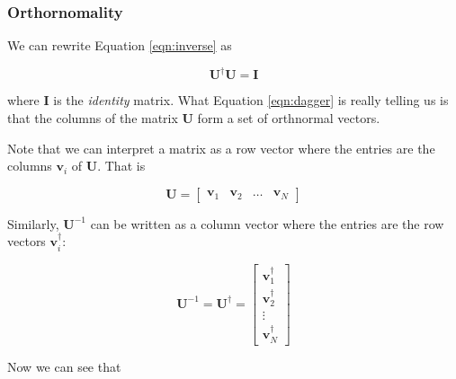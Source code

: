 \documentclass[11pt, oneside]{article}   	%
\begin{document}
\subsubsection{Orthornomality}
We can rewrite Equation \ref{eqn:inverse} as

\begin{equation}
\mathbf{U}^{\dagger} \mathbf{U} = \mathbf{I}
\label{eqn:dagger}
\end{equation}

\bigskip
\noindent
where \textbf{I} is the \emph{identity} matrix. What Equation \ref{eqn:dagger} is really telling us is that the columns of the matrix \textbf{U} form a set of orthnormal vectors.

\bigskip
\noindent
Note that we can interpret a matrix as a row vector where the entries are the columns  $\mathbf{v}_i$ of \textbf{U}. That is

\begin{equation*}
\mathbf{U} = \begin{bmatrix} \mathbf{v}_1 & \mathbf{v}_2 & \hdots & \mathbf{v}_{N} \end{bmatrix}
\end{equation*}

\bigskip
\noindent
Similarly, $\mathbf{U}^{-1}$ can be written as a column vector where the entries are the row vectors $ \mathbf{v}_{i}^\dagger$:

\begin{equation*}
\mathbf{U}^{-1} = \mathbf{U}^{\dagger} = \begin{bmatrix} \mathbf{v}_1^\dagger \\ \mathbf{v}_2^\dagger \\ \vdots  \\ \mathbf{v}_{N}^\dagger  \end{bmatrix}
\end{equation*}

\bigskip
\noindent
Now we can see that 
\end{document}
